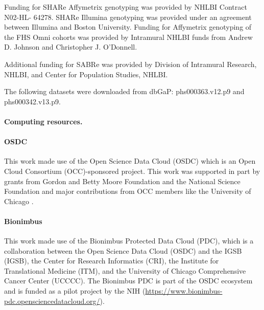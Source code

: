 \documentclass[10pt,letterpaper]{article}
\begin{document}
Funding for SHARe Affymetrix genotyping was provided by NHLBI Contract N02-HL- 64278. SHARe Illumina genotyping was provided under an agreement between Illumina and Boston University. Funding for Affymetrix genotyping of the FHS Omni cohorts was provided by Intramural NHLBI funds from Andrew D. Johnson and Christopher J. O'Donnell.

Additional funding for SABRe was provided by Division of Intramural Research, NHLBI, and Center for Population Studies, NHLBI.

The following datasets were downloaded from dbGaP: phs000363.v12.p9 and phs000342.v13.p9.

\paragraph{Computing resources.}\label{computing-resources}

\paragraph{OSDC}

This work made use of the Open Science Data Cloud (OSDC) which is an
Open Cloud Consortium (OCC)-sponsored project. This work was supported
in part by grants from Gordon and Betty Moore Foundation and the
National Science Foundation and major contributions from OCC members
like the University of Chicago \cite{grossman2012design}.

\paragraph{Bionimbus}
This work made use of the
Bionimbus Protected Data Cloud (PDC), which is a collaboration between
the Open Science Data Cloud (OSDC) and the IGSB (IGSB), the Center for
Research Informatics (CRI), the Institute for Translational Medicine
(ITM), and the University of Chicago Comprehensive Cancer Center
(UCCCC). The Bionimbus PDC is part of the OSDC ecosystem and is funded
as a pilot project by the NIH \cite{heath2014bionimbus} (\url{https://www.bionimbus-pdc.opensciencedatacloud.org/}).


\nolinenumbers


%
%
% 
\end{document}
